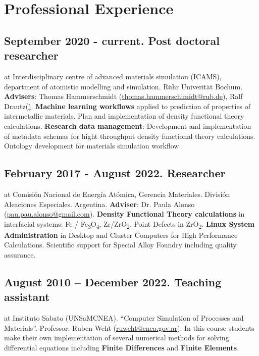 \section{Professional Experience}

\subsection{September 2020 - current. Post doctoral researcher}
at Interdisciplinary centre of advanced materials simulation (ICAMS), 
department of atomistic modelling and simulation. 
Rühr Univerität Bochum. \textbf{Advisers}: Thomas Hammerschmidt (\href{mailto:thomas.hammerschmidt@rub.de}{thomas.hammerschimidt@rub.de}), Ralf Drautz(\href{mailto:ralf.drautz@rub.de}).
\textbf{Machine learning workflows} applied to prediction of properties of intermetallic materials.
Plan and implementation of density functional theory calculations. 
\textbf{Research data management}: Development and implementation of metadata schemas for 
hight throughput density functional theory calculations.  
Ontology development for materials simulation workflow. 

\subsection{February 2017 - August 2022. Researcher} at Comisión Nacional de Energía
Atómica,  Gerencia Materiales. División Aleaciones Especiales. Argentina. \textbf{
Adviser}: Dr. Paula Alonso (\href{mailto:pau.pau.alonso@gmail.com}{pau.pau.alonso@gmail.com}). 
  \textbf{Density Functional Theory calculations} in interfacial systems: Fe /
Fe\textsubscript{3}O\textsubscript{4}, Zr/ZrO\textsubscript{2}. Point Defects in
ZrO\textsubscript{2}. \textbf{Linux System Administration} in Desktop and Cluster
Computers for High Performance Calculations. 
Scientific support for Special Alloy Foundry including quality
assurance.

\subsection{August 2010 – December 2022. Teaching assistant} at Instituto Sabato
(UNSaM\-CNEA). “Computer Simulation of Processes and
Materials”. Professor: Ruben Weht (\href{mailto:ruweht@cnea.gov.ar}{ruweht@cnea.gov.ar}). In this course
students make their own implementation of several numerical methods for solving
differential equations including \textbf{Finite Differences} and \textbf{Finite Elements}.

